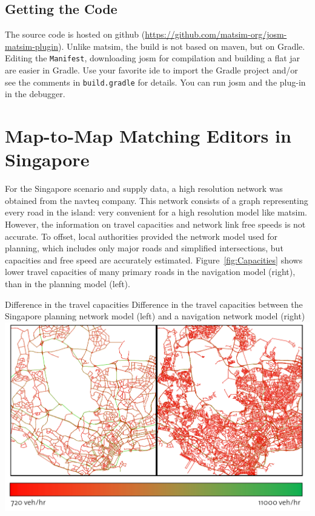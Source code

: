 \subsection{Getting the Code}
The source code is hosted on github (\url{https://github.com/matsim-org/josm-matsim-plugin}). Unlike \gls{matsim}, the build is not based on \gls{maven}, but on Gradle. Editing the \lstinline|Manifest|, downloading \gls{josm} for compilation and building a flat \gls{jar} are easier in Gradle. Use your favorite \gls{ide} to import the Gradle project and/or see the comments in \lstinline|build.gradle| for details. You can run \gls{josm} and the plug-in in the debugger.
 
\section{Map-to-Map Matching Editors in Singapore}
\label{sec:networkeditor-singapore}
For the Singapore scenario and supply data, a high resolution network was obtained from the \gls{navteq} company. This network consists of a graph representing every road in the island: very convenient for a high resolution model like \gls{matsim}. However, the information on travel capacities and network link free speeds is not accurate. To offset, local authorities provided the network model used for planning, which includes only major roads and simplified intersections, but capacities and free speed are accurately estimated. Figure~\ref{fig:Capacities} shows lower travel capacities of many primary roads in the navigation model (right), than in the planning model (left).

\createfigure
{Difference in the travel capacities}
{Difference in the travel capacities between the Singapore planning network model (left) and a navigation network model (right)}
{\label{fig:Capacities}}
{\includegraphics[width=1.0\textwidth]{extending/figures/netEdSing/Capacities.png}}
{}


